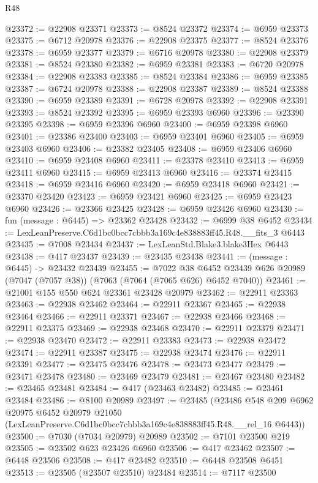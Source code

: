 \begin{lexlean}{R48}
\begin{coremodule}
@23372 := @22908 @23371
@23373 := @8524 @23372
@23374 := @6959 @23373
@23375 := @6712 @20978
@23376 := @22908 @23375
@23377 := @8524 @23376
@23378 := @6959 @23377
@23379 := @6716 @20978
@23380 := @22908 @23379
@23381 := @8524 @23380
@23382 := @6959 @23381
@23383 := @6720 @20978
@23384 := @22908 @23383
@23385 := @8524 @23384
@23386 := @6959 @23385
@23387 := @6724 @20978
@23388 := @22908 @23387
@23389 := @8524 @23388
@23390 := @6959 @23389
@23391 := @6728 @20978
@23392 := @22908 @23391
@23393 := @8524 @23392
@23395 := @6959 @23393 @6960
@23396 := @23390 @23395
@23398 := @6959 @23396 @6960
@23400 := @6959 @23398 @6960
@23401 := @23386 @23400
@23403 := @6959 @23401 @6960
@23405 := @6959 @23403 @6960
@23406 := @23382 @23405
@23408 := @6959 @23406 @6960
@23410 := @6959 @23408 @6960
@23411 := @23378 @23410
@23413 := @6959 @23411 @6960
@23415 := @6959 @23413 @6960
@23416 := @23374 @23415
@23418 := @6959 @23416 @6960
@23420 := @6959 @23418 @6960
@23421 := @23370 @23420
@23423 := @6959 @23421 @6960
@23425 := @6959 @23423 @6960
@23426 := @23366 @23425
@23428 := @6959 @23426 @6960
@23430 := fun (message : @6445) => @23362 @23428
@23432 := @6999 @38 @6452
@23434 := LexLeanPreserve.C6d1bc0bcc7cbbb3a169c4e838883ff45.R48.__fits_3 @6443
@23435 := @7008 @23434
@23437 := LexLeanStd.Blake3.blake3Hex @6443
@23438 := @417 @23437
@23439 := @23435 @23438
@23441 := (message : @6445) -> @23432 @23439
@23455 := @7022
    @38
    @6452
    @23439
    @626
    @20989
    (@7047 (@7057 @38))
    (@7063 (@7064 (@7065 @626) @6452 @7040))
@23461 := @21001 @155 @550 @624 @23361 @23428 @20979
@23462 := @22911 @23363
@23463 := @22938 @23462
@23464 := @22911 @23367
@23465 := @22938 @23464
@23466 := @22911 @23371
@23467 := @22938 @23466
@23468 := @22911 @23375
@23469 := @22938 @23468
@23470 := @22911 @23379
@23471 := @22938 @23470
@23472 := @22911 @23383
@23473 := @22938 @23472
@23474 := @22911 @23387
@23475 := @22938 @23474
@23476 := @22911 @23391
@23477 := @23475 @23476
@23478 := @23473 @23477
@23479 := @23471 @23478
@23480 := @23469 @23479
@23481 := @23467 @23480
@23482 := @23465 @23481
@23484 := @417 (@23463 @23482)
@23485 := @23461 @23484
@23486 := @8100 @20989
@23497 := @23485
    (@23486
      @548
      @209
      @6962
      @20975
      @6452
      @20979
      @21050
      (LexLeanPreserve.C6d1bc0bcc7cbbb3a169c4e838883ff45.R48.__rel_16 @6443))
@23500 := @7030 (@7034 @20979) @20989
@23502 := @7101 @23500 @219
@23505 := @23502 @623 @23426 @6960
@23506 := @417 @23462
@23507 := @6448 @23506
@23508 := @417 @23482
@23510 := @6448 @23508 @6451
@23513 := @23505 (@23507 @23510) @23484
@23514 := @7117 @23500

\end{coremodule}
\end{lexlean}
